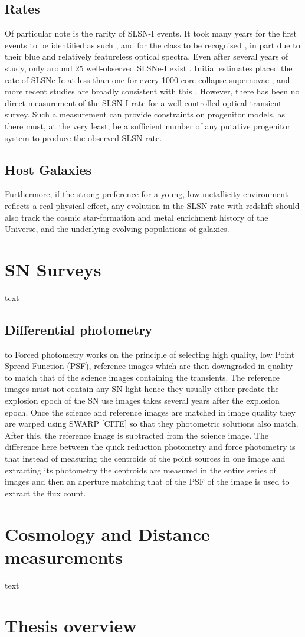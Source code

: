 \subsection{Rates}
Of particular note is the rarity of SLSN-I events. It took many years
for the first events to be identified as such
\citep{2007ApJ...668L..99Q,2009ApJ...690.1358B}, and for the class to
be recognised \citep{2011Natur.474..487Q}, in part due to their blue
and relatively featureless optical spectra. Even after several years
of study, only around 25 well-observed SLSNe-I exist \citep[e.g., see
compilations
in][]{2014ApJ...796...87I,2015MNRAS.449.1215P,2015MNRAS.452.3869N}.
Initial estimates placed the rate of SLSNe-Ic at less than one for
every 1000 core collapse supernovae \citep{2011Natur.474..487Q}, and more
recent studies are broadly consistent with this
\citep{2013MNRAS.431..912Q,2015MNRAS.448.1206M}.  However, there has
been no direct measurement of the SLSN-I rate for a well-controlled
optical transient survey. Such a measurement can provide constraints
on progenitor models, as there must, at the very least, be a
sufficient number of any putative progenitor system to produce the
observed SLSN rate.

\subsection{Host Galaxies}
Furthermore, if the strong preference for a young,
low-metallicity environment reflects a real physical effect, any
evolution in the SLSN rate with redshift should also track the cosmic
star-formation and metal enrichment history of the Universe, and the
underlying evolving populations of galaxies.

\section{SN Surveys}
text

\subsection{Differential photometry}
to Forced photometry works on the principle of selecting high quality, low Point Spread Function (PSF), reference images which are then downgraded in quality to match that of the science images containing the transients. The reference images must not contain any SN light hence they usually either predate the explosion epoch of the SN use images takes several years after the explosion epoch. Once the science and reference images are matched in image quality they are warped using SWARP [CITE] so that they photometric solutions also match. After this, the reference image is subtracted from the science image. The difference here between the quick reduction photometry and force photometry is that instead of measuring the centroids of the point sources in one image and extracting its photometry the centroids are measured in the entire series of images and then an aperture matching that of the PSF of the image is used to extract the flux count.

\section{Cosmology and Distance measurements}
text

\section{Thesis overview}
